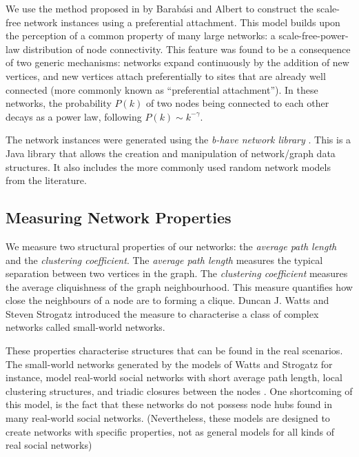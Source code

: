 \documentclass[preprint,number]{elsarticle}
\begin{document}
        We use the method proposed in \cite{Barabasi1999} by Barab\'{a}si and Albert to construct
        the scale-free network instances using a preferential attachment. This model builds upon the
        perception of a common property of many large networks: a scale-free-power-law distribution
        of node connectivity. This feature was found to be a consequence of two generic mechanisms:
        networks expand continuously by the addition of new vertices, and new vertices attach
        preferentially to sites that are already well connected (more commonly known as
        ``preferential attachment''). In these networks, the probability $P(k)$ of two nodes being
        connected to each other decays as a power law, following $P(k) \sim k^{- \gamma}$.

        The network instances were generated using the \textit{b-have network library}
        \cite{Nunes:Software:11069}. This is a Java library that allows the creation and
        manipulation of network/graph data structures. It also includes the more commonly used
        random network models from the literature.

        \subsection{Measuring Network Properties}
        \noindent We measure two structural properties of our networks: the \textit{average path
          length} and the \textit{clustering coefficient}. The \textit{average path length} measures
        the typical separation between two vertices in the graph. The \textit{clustering
          coefficient} measures the average cliquishness of the graph neighbourhood. This measure
        quantifies how close the neighbours of a node are to forming a clique. Duncan J. Watts and
        Steven Strogatz \cite{Watts1998} introduced the measure to characterise a class of complex
        networks called small-world networks.

        These properties characterise structures that can be found in the real scenarios. The
        small-world networks generated by the models of Watts and Strogatz for instance, model
        real-world social networks with short average path length, local clustering structures, and
        triadic closures between the nodes \cite{Watts1998}. One shortcoming of this model, is the
        fact that these networks do not possess node hubs found in many real-world social
        networks. (Nevertheless, these models are designed to create networks with specific
        properties, not as general models for all kinds of real social networks)
\end{document}
